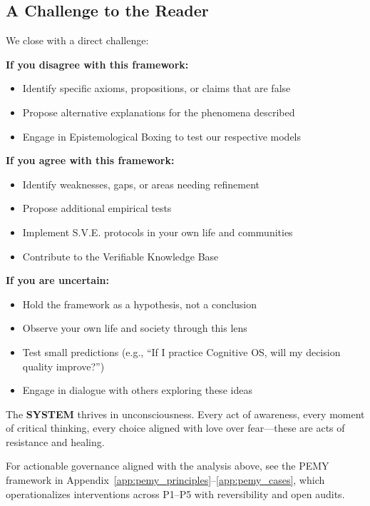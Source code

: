 \documentclass[11pt,a4paper]{article}
\newcommand{\SYSTEM}{\textbf{SYSTEM}}
\theoremstyle{definition}
\theoremstyle{remark}
\begin{document}
\subsection{A Challenge to the Reader}

We close with a direct challenge:

\textbf{If you disagree with this framework:}
\begin{itemize}
    \item Identify specific axioms, propositions, or claims that are false
    \item Propose alternative explanations for the phenomena described
    \item Engage in Epistemological Boxing to test our respective models
\end{itemize}

\textbf{If you agree with this framework:}
\begin{itemize}
    \item Identify weaknesses, gaps, or areas needing refinement
    \item Propose additional empirical tests
    \item Implement S.V.E. protocols in your own life and communities
    \item Contribute to the Verifiable Knowledge Base
\end{itemize}

\textbf{If you are uncertain:}
\begin{itemize}
    \item Hold the framework as a hypothesis, not a conclusion
    \item Observe your own life and society through this lens
    \item Test small predictions (e.g., ``If I practice Cognitive OS, will my decision quality improve?'')
    \item Engage in dialogue with others exploring these ideas
\end{itemize}

The \SYSTEM{} thrives in unconsciousness. Every act of awareness, every moment of critical thinking, every choice aligned with love over fear---these are acts of resistance and healing.

\noindent
For actionable governance aligned with the analysis above, see the PEMY framework in Appendix~\ref{app:pemy_principles}--\ref{app:pemy_cases}, which operationalizes interventions across P1--P5 with reversibility and open audits.


\vspace{1em}
\end{document}
